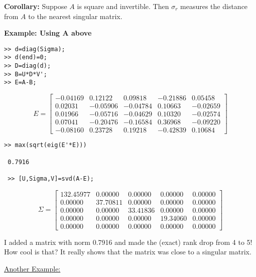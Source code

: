 \documentclass[letterpaper]{article}
\begin{document}
\textbf{Corollary:}  Suppose $A$ is square and invertible. Then $\sigma_r$ measures the distance from $A$ to the nearest singular matrix.

\vspace*{1cm}

\textbf{Example: Using A above}

\begin{verbatim}
>> d=diag(Sigma);
>> d(end)=0;
>> D=diag(d);
>> B=U*D*V';
>> E=A-B;
\end{verbatim}
$$E=\left[
\begin{array}{rrrrr}-0.04169& 0.12122& 0.09818& -0.21886& 0.05458\\0.02031& -0.05906& -0.04784& 0.10663& -0.02659\\0.01966& -0.05716& -0.04629& 0.10320& -0.02574\\0.07041& -0.20476& -0.16584& 0.36968& -0.09220\\-0.08160& 0.23728& 0.19218& -0.42839& 0.10684\end{array} \right]$$

\begin{verbatim}
>> max(sqrt(eig(E'*E)))

 0.7916

 >> [U,Sigma,V]=svd(A-E);
\end{verbatim}

$$\Sigma=\left[ \begin{array}{rrrrr}132.45977& 0.00000&0.00000&0.00000&0.00000\\0.00000&37.70811& 0.00000&0.00000&0.00000\\0.00000&0.00000&33.41836& 0.00000&0.00000\\0.00000&0.00000&0.00000&19.34060& 0.00000\\0.00000& 0.00000& 0.00000& 0.00000& 0.00000\end{array} \right] $$

\vspace*{1cm}
I added a matrix with norm 0.7916 and made the (exact)  rank drop from 4 to 5! How cool is that? It really shows that the matrix was close to a singular matrix.

\underline{Another Example:}



\newpage
\end{document}
